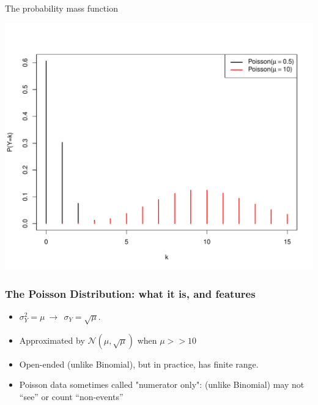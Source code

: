 \documentclass[handout]{beamer}\usepackage[]{graphicx}\usepackage[]{color}
\newenvironment{knitrout}{}{} %
\begin{document}
\begin{frame}[fragile]{The probability mass function}

\begin{knitrout}\scriptsize
{}\color{fgcolor}

{\centering \includegraphics[width=1\linewidth]{figure/unnamed-chunk-6-1} 

}



\end{knitrout}

\end{frame}


\begin{frame}
\frametitle{The Poisson Distribution: what it is, and features}

\begin{itemize}
\setlength\itemsep{2em}
\item  $\sigma^2_Y =  \mu \ \to \ \ \sigma_Y =  \sqrt{\mu}.$ \pause
\item  Approximated by $\mathcal{N}(\mu, \sqrt{\mu})$ when $\mu >> 10$ \pause 
\item Open-ended (unlike Binomial), but in practice, has finite range. 

\item Poisson data sometimes called "numerator only":  (unlike Binomial) may not ``see'' or  count ``non-events''
\end{itemize}
\end{frame}
\end{document}
